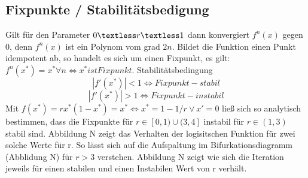 \documentclass{scrartcl}
\begin{document}
\subsection{Fixpunkte / Stabilitätsbedigung}
Gilt für den Parameter $0 \textless r \textless 1$ dann konvergiert $f^n(x)$ gegen 0, denn $f^n(x)$ ist ein Polynom vom grad $2n$.
Bildet die Funktion einen Punkt idempotent ab, so handelt es sich um einen Fixpunkt, es gilt: $f^n(x^*)=x^* \forall n \iff x^* ist Fixpunkt$. 
Stabilitätsbedingung
$$|f'(x^*)|<1 \iff Fixpunkt-stabil$$
$$|f'(x^*)|>1 \iff Fixpunkt-instabil$$ Mit
\begin{math}
f(x^*)=rx^*(1-x^*)=x^*
\iff x^*=1-1/r \vee x'=0
\end{math}
ließ sich so analytisch bestimmen, dass die Fixpunkte für $r \in [0,1) \cup (3,4]$ instabil für $r \in (1,3)$ stabil sind.
Abbildung N zeigt das Verhalten der logisitschen Funktion für zwei solche Werte für r. So lässt sich auf die Aufspaltung im Bifurkationsdiagramm (Abblidung N) für $r>3$ verstehen. Abbildung N zeigt wie sich die Iteration jeweils für einen stabilen und einen Instabilen Wert von r verhält. 
\end{document}
